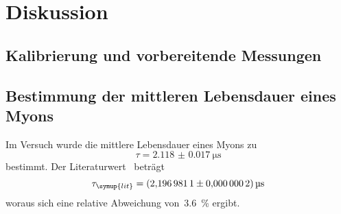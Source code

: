 \section{Diskussion}
\label{sec:diskussion}

\subsection{Kalibrierung und vorbereitende Messungen}

\subsection{Bestimmung der mittleren Lebensdauer eines Myons}

Im Versuch wurde die mittlere Lebensdauer eines Myons zu
%
\begin{equation}
  \tau=\SI{2.118(17)}{\micro\second}
\end{equation}
%
bestimmt. Der Literaturwert~\cite[14]{pdg} beträgt
%
\begin{equation}
  \tau_{\symup{lit}}=\SI{2.1969811(2)}{\micro\second}
\end{equation}
%
woraus sich eine relative Abweichung von~\SI{3.6}{\percent} ergibt.
